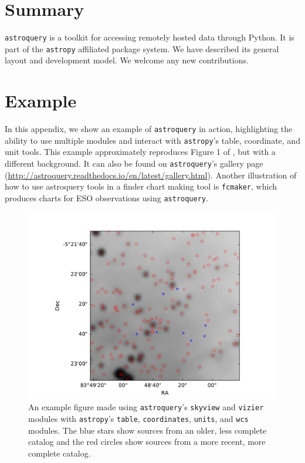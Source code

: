 \documentclass[twocolumn]{aastex62}
\newcommand{\package}[1]{\texttt{#1}\xspace}
\newcommand{\astroquery}{\package{astroquery}}
\newcommand{\astropypkg}{\package{astropy}}
\begin{document}
\section{Summary}
\astroquery is a toolkit for accessing remotely hosted data through Python.
It is part of the \astropypkg affiliated package system.
We have described its general layout and development model.
We welcome any new contributions.





\appendix
\section{Example}
\label{sec:example}
In this appendix, we show an example of \astroquery in action, highlighting the
ability to use multiple modules and interact with \astropypkg's table, coordinate,
and unit tools.  This example approximately reproduces Figure 1 of
\citet{Eisner2016a}, but with a different background.  It can also be found on
\astroquery's gallery page
(\url{http://astroquery.readthedocs.io/en/latest/gallery.html}).
Another illustration of how to use astroquery tools in a finder chart making 
tool is \texttt{fcmaker}, which produces charts for ESO observations using
\astroquery \citep{Vogt2018a}.


\newpage



\begin{figure}[!htp]
\includegraphics[scale=1,width=7in]{example_figure_1.pdf}
\caption{An example figure made using \astroquery's \texttt{skyview} and
\texttt{vizier} modules with \astropypkg's \texttt{table}, \texttt{coordinates},
\texttt{units}, and \texttt{wcs} modules.  The blue stars show sources from
an older, less complete catalog and the red circles show sources from a more
recent, more complete catalog.
}
\label{fig:example1}
\end{figure}
\end{document}
